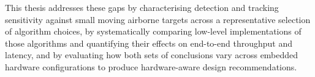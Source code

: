 This thesis addresses these gaps by characterising detection and tracking
sensitivity against small moving airborne targets across a representative
selection of algorithm choices, by systematically comparing low-level
implementations of those algorithms and quantifying their effects on
end-to-end throughput and latency, and by evaluating how both sets of
conclusions vary across embedded hardware configurations to produce
hardware-aware design recommendations.